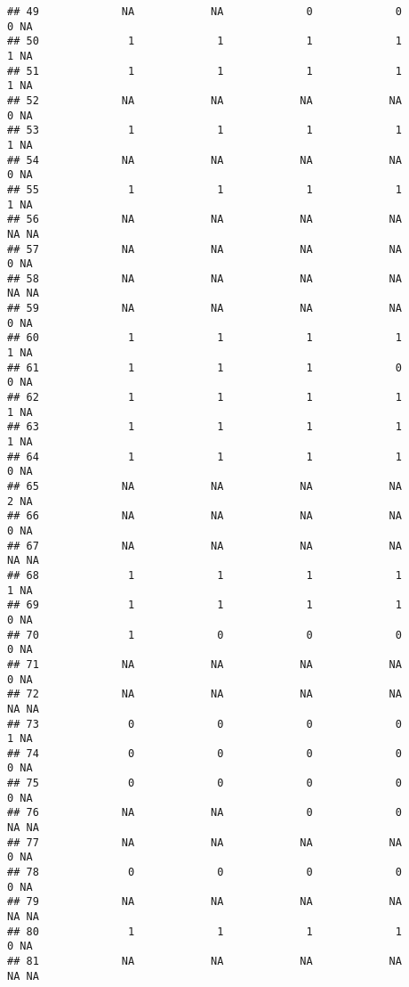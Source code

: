 \documentclass[
]{article}
\begin{document}
\begin{verbatim}
## 49             NA            NA             0             0             0 NA
## 50              1             1             1             1             1 NA
## 51              1             1             1             1             1 NA
## 52             NA            NA            NA            NA             0 NA
## 53              1             1             1             1             1 NA
## 54             NA            NA            NA            NA             0 NA
## 55              1             1             1             1             1 NA
## 56             NA            NA            NA            NA            NA NA
## 57             NA            NA            NA            NA             0 NA
## 58             NA            NA            NA            NA            NA NA
## 59             NA            NA            NA            NA             0 NA
## 60              1             1             1             1             1 NA
## 61              1             1             1             0             0 NA
## 62              1             1             1             1             1 NA
## 63              1             1             1             1             1 NA
## 64              1             1             1             1             0 NA
## 65             NA            NA            NA            NA             2 NA
## 66             NA            NA            NA            NA             0 NA
## 67             NA            NA            NA            NA            NA NA
## 68              1             1             1             1             1 NA
## 69              1             1             1             1             0 NA
## 70              1             0             0             0             0 NA
## 71             NA            NA            NA            NA             0 NA
## 72             NA            NA            NA            NA            NA NA
## 73              0             0             0             0             1 NA
## 74              0             0             0             0             0 NA
## 75              0             0             0             0             0 NA
## 76             NA            NA             0             0            NA NA
## 77             NA            NA            NA            NA             0 NA
## 78              0             0             0             0             0 NA
## 79             NA            NA            NA            NA            NA NA
## 80              1             1             1             1             0 NA
## 81             NA            NA            NA            NA            NA NA

\end{verbatim}
\end{document}
